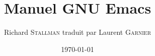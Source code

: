\title{Manuel GNU Emacs}
\author{Richard \textsc{Stallman} traduit par Laurent \textsc{Garnier}}
\date{\today{}}
